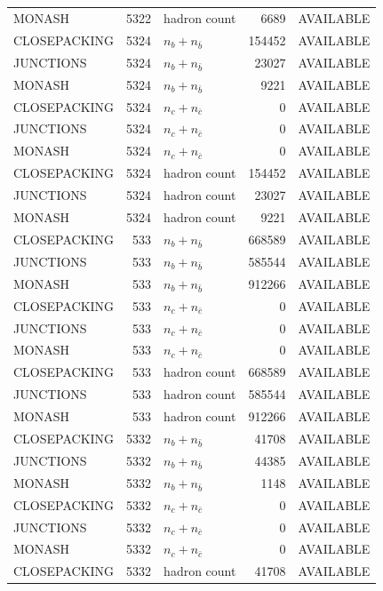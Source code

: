 \begin{landscape}
\begin{longtable}{@{}lrlrl@{}}
MONASH & 5322 & hadron count & \num{6689} & AVAILABLE \\
CLOSEPACKING & 5324 & $n_b+n_{\bar b}$ & \num{154452} & AVAILABLE \\
JUNCTIONS & 5324 & $n_b+n_{\bar b}$ & \num{23027} & AVAILABLE \\
MONASH & 5324 & $n_b+n_{\bar b}$ & \num{9221} & AVAILABLE \\
CLOSEPACKING & 5324 & $n_c+n_{\bar c}$ & \num{0} & AVAILABLE \\
JUNCTIONS & 5324 & $n_c+n_{\bar c}$ & \num{0} & AVAILABLE \\
MONASH & 5324 & $n_c+n_{\bar c}$ & \num{0} & AVAILABLE \\
CLOSEPACKING & 5324 & hadron count & \num{154452} & AVAILABLE \\
JUNCTIONS & 5324 & hadron count & \num{23027} & AVAILABLE \\
MONASH & 5324 & hadron count & \num{9221} & AVAILABLE \\
CLOSEPACKING & 533 & $n_b+n_{\bar b}$ & \num{668589} & AVAILABLE \\
JUNCTIONS & 533 & $n_b+n_{\bar b}$ & \num{585544} & AVAILABLE \\
MONASH & 533 & $n_b+n_{\bar b}$ & \num{912266} & AVAILABLE \\
CLOSEPACKING & 533 & $n_c+n_{\bar c}$ & \num{0} & AVAILABLE \\
JUNCTIONS & 533 & $n_c+n_{\bar c}$ & \num{0} & AVAILABLE \\
MONASH & 533 & $n_c+n_{\bar c}$ & \num{0} & AVAILABLE \\
CLOSEPACKING & 533 & hadron count & \num{668589} & AVAILABLE \\
JUNCTIONS & 533 & hadron count & \num{585544} & AVAILABLE \\
MONASH & 533 & hadron count & \num{912266} & AVAILABLE \\
CLOSEPACKING & 5332 & $n_b+n_{\bar b}$ & \num{41708} & AVAILABLE \\
JUNCTIONS & 5332 & $n_b+n_{\bar b}$ & \num{44385} & AVAILABLE \\
MONASH & 5332 & $n_b+n_{\bar b}$ & \num{1148} & AVAILABLE \\
CLOSEPACKING & 5332 & $n_c+n_{\bar c}$ & \num{0} & AVAILABLE \\
JUNCTIONS & 5332 & $n_c+n_{\bar c}$ & \num{0} & AVAILABLE \\
MONASH & 5332 & $n_c+n_{\bar c}$ & \num{0} & AVAILABLE \\
CLOSEPACKING & 5332 & hadron count & \num{41708} & AVAILABLE \\

\end{longtable}
\end{landscape}
